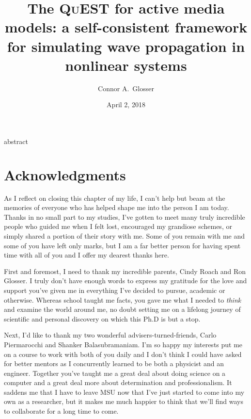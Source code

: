 \documentclass[mixedtoc]{msu-thesis-custom}
\title{The \textsc{QuEST} for active media models: a self-consistent framework for simulating wave propagation in nonlinear systems}
\author{Connor A.\ Glosser}
\date{April 2, 2018}
\begin{document}
\frontmatter
\maketitlepage

{abstract}

\clearpage

\makecopyrightpage


\makededicationpage

\clearpage
\chapter*{Acknowledgments}
\DoubleSpacing %
As I reflect on closing this chapter of my life, I can't help but beam at the
memories of everyone who has helped shape me into the person I am today. Thanks
in no small part to my studies, I've gotten to meet many truly incredible
people who guided me when I felt lost, encouraged my grandiose schemes, or
simply shared a portion of their story with me. Some of you remain with me and
some of you have left only marks, but I am a far better person for having spent
time with all of you and I offer my dearest thanks here.

First and foremost, I need to thank my incredible parents, Cindy Roach and Ron
Glosser. I truly don't have enough words to express my gratitude for the love
and support you've given me in everything I've decided to pursue, academic or
otherwise.  Whereas school taught me facts, you gave me what I needed to
\emph{think} and examine the world around me, no doubt setting me on a lifelong
journey of scientific and personal discovery on which this Ph.D is but a stop.

Next, I'd like to thank my two wonderful advisers-turned-friends, Carlo
Piermarocchi and Shanker Balasubramaniam.  I'm so happy my interests put me on
a course to work with both of you daily and I don't think I could have asked
for better mentors as I concurrently learned to be both a physicist and an
engineer. Together you've taught me a great deal about doing science on a
computer and a great deal more about determination and professionalism. It
saddens me that I have to leave MSU now that I've just started to come into my
own as a researcher, but it makes me much happier to think that we'll find ways
to collaborate for a long time to come.
\end{document}

